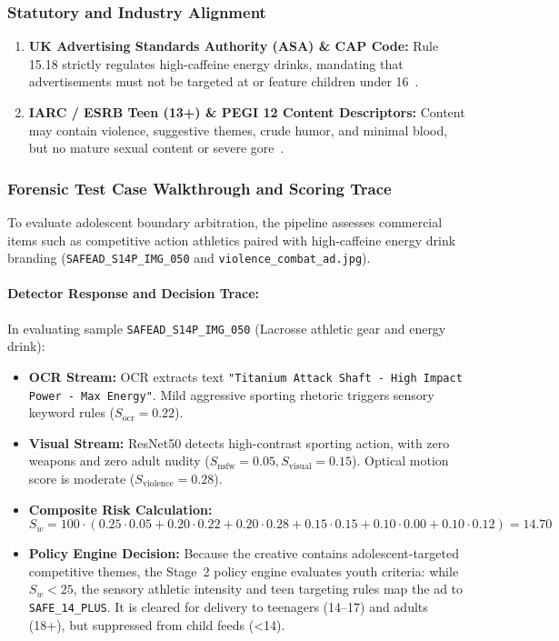 \documentclass[12pt,a4paper]{report}
\begin{document}
\subsubsection{Statutory and Industry Alignment}
\begin{enumerate}
    \item \textbf{UK Advertising Standards Authority (ASA) \& CAP Code:} Rule 15.18 strictly regulates high-caffeine energy drinks, mandating that advertisements must not be targeted at or feature children under 16~\cite{ftc2023guides}.
    \item \textbf{IARC / ESRB Teen (13+) \& PEGI 12 Content Descriptors:} Content may contain violence, suggestive themes, crude humor, and minimal blood, but no mature sexual content or severe gore~\cite{iarcratings}.
\end{enumerate}

\subsubsection{Forensic Test Case Walkthrough and Scoring Trace}
To evaluate adolescent boundary arbitration, the pipeline assesses commercial items such as competitive action athletics paired with high-caffeine energy drink branding (\texttt{SAFEAD\_S14P\_IMG\_050} and \texttt{violence\_combat\_ad.jpg}).

\paragraph{Detector Response and Decision Trace:}
In evaluating sample \texttt{SAFEAD\_S14P\_IMG\_050} (Lacrosse athletic gear and energy drink):
\begin{itemize}
    \item \textbf{OCR Stream:} OCR extracts text \texttt{"Titanium Attack Shaft - High Impact Power - Max Energy"}. Mild aggressive sporting rhetoric triggers sensory keyword rules ($S_{\text{ocr}} = 0.22$).
    \item \textbf{Visual Stream:} ResNet50 detects high-contrast sporting action, with zero weapons and zero adult nudity ($S_{\text{nsfw}} = 0.05, S_{\text{visual}} = 0.15$). Optical motion score is moderate ($S_{\text{violence}} = 0.28$).
    \item \textbf{Composite Risk Calculation:}
    \begin{equation}
    S_w = 100 \cdot (0.25 \cdot 0.05 + 0.20 \cdot 0.22 + 0.20 \cdot 0.28 + 0.15 \cdot 0.15 + 0.10 \cdot 0.00 + 0.10 \cdot 0.12) = 14.70
    \end{equation}
    \item \textbf{Policy Engine Decision:} Because the creative contains adolescent-targeted competitive themes, the Stage~2 policy engine evaluates youth criteria: while $S_w < 25$, the sensory athletic intensity and teen targeting rules map the ad to \texttt{SAFE\_14\_PLUS}. It is cleared for delivery to teenagers (14--17) and adults (18+), but suppressed from child feeds (<14).
\end{itemize}
\end{document}
